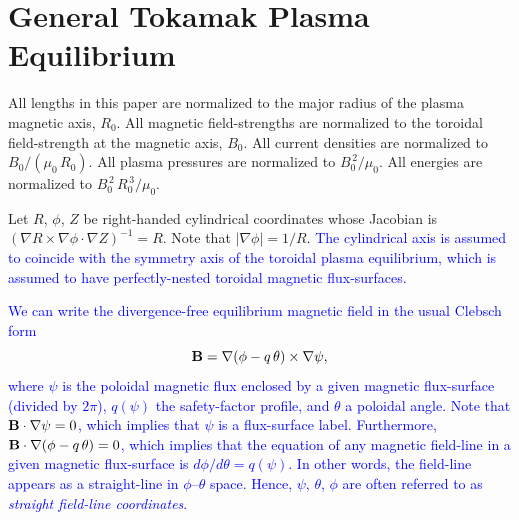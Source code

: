 \documentclass[12pt,prb,aps]{revtex4-1}
\begin{document}
\section{General Tokamak Plasma Equilibrium}\label{geq}
All lengths  in this paper  are normalized to  the major radius of the plasma magnetic axis, $R_0$. All magnetic field-strengths
are normalized to the  toroidal field-strength at the magnetic axis, $B_0$. All current densities are normalized to $B_0/(\mu_0\,R_0)$. 
 All plasma pressures are normalized to $B_0^{\,2}/\mu_0$. All energies are normalized to $B_0^{\,2}\,R_0^{\,3}/\mu_0$. 

Let $R$, $\phi$, $Z$ be right-handed cylindrical coordinates whose Jacobian 
is
$(\nabla R\times \nabla\phi\cdot\nabla Z)^{-1} = R$. 
Note that $|\nabla\phi|=1/R$. \textcolor{blue}{The cylindrical axis is assumed to coincide with the symmetry axis of the toroidal plasma equilibrium, which
is assumed to have perfectly-nested toroidal magnetic flux-surfaces. }

\textcolor{blue}{We can write the divergence-free equilibrium magnetic field in the usual Clebsch form\,\cite{boozer}
\begin{equation}
{\bf B}= \nabla(\phi-q\,\theta)\times\nabla\psi,
\end{equation}
where $\psi$ is the poloidal magnetic flux enclosed by a given magnetic flux-surface (divided by $2\pi$), $q(\psi)$ the safety-factor profile, and
$\theta$  a poloidal angle. Note that ${\bf B}\cdot\nabla\psi=0$, which implies that $\psi$ is a flux-surface label. Furthermore, ${\bf B}\cdot\nabla(\phi-q\,\theta)=0$, which implies that the equation of any magnetic field-line in a given magnetic flux-surface is $d\phi/d\theta = q(\psi)$. In other words, the
field-line appears as a straight-line in $\phi$--$\theta$ space. Hence, $\psi$, $\theta$, $\phi$ are often referred to as {\em straight field-line coordinates}.} 
\end{document}
